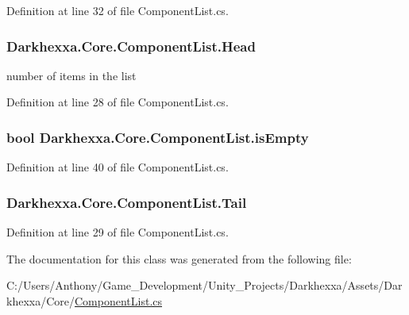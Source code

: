 Definition at line 32 of file Component\-List.\-cs.

\hypertarget{class_darkhexxa_1_1_core_1_1_component_list_aaf3c579fbb8e52b3077d38dd218ec357}{
\subsubsection[{Head}]{ Darkhexxa.\-Core.\-Component\-List.\-Head\hspace{0.3cm}{\ttfamily [get]}}}\label{class_darkhexxa_1_1_core_1_1_component_list_aaf3c579fbb8e52b3077d38dd218ec357}


number of items in the list 



Definition at line 28 of file Component\-List.\-cs.

\hypertarget{class_darkhexxa_1_1_core_1_1_component_list_a7566c88897f93bb027480738d184907b}{
\subsubsection[{is\-Empty}]{\setlength{\rightskip}{0pt plus 5cm}bool Darkhexxa.\-Core.\-Component\-List.\-is\-Empty\hspace{0.3cm}{\ttfamily [get]}}}\label{class_darkhexxa_1_1_core_1_1_component_list_a7566c88897f93bb027480738d184907b}


Definition at line 40 of file Component\-List.\-cs.

\hypertarget{class_darkhexxa_1_1_core_1_1_component_list_a5690588d6657c520569aa5cd171914ea}{
\subsubsection[{Tail}]{ Darkhexxa.\-Core.\-Component\-List.\-Tail\hspace{0.3cm}{\ttfamily [get]}}}\label{class_darkhexxa_1_1_core_1_1_component_list_a5690588d6657c520569aa5cd171914ea}


Definition at line 29 of file Component\-List.\-cs.



The documentation for this class was generated from the following file\-:\begin{DoxyCompactItemize}
\item 
C\-:/\-Users/\-Anthony/\-Game\-\_\-\-Development/\-Unity\-\_\-\-Projects/\-Darkhexxa/\-Assets/\-Darkhexxa/\-Core/\hyperlink{_component_list_8cs}{Component\-List.\-cs}\end{DoxyCompactItemize}
